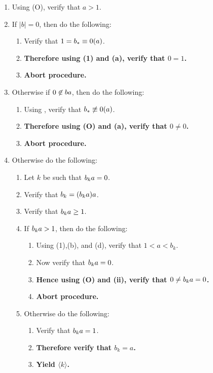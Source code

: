 \documentclass[twocolumn]{article}
\let\div\relax
\DeclareMathOperator{\div}{div}
\let\mod\relax
\DeclareMathOperator{\mod}{mod}
\newcommand{\procedurehr}[2][]{\hyperref[sec:procedure #2]{\ifthenelse{\equal{#1}{}}{procedure #2}{#1}}}
\begin{document}
				\begin{enumerate}
					\item Using (O), verify that $a>1$.
					\item If $\lvert b\rvert=0$, then do the following:
					\begin{enumerate}
						\item Verify that $1=b_*\equiv 0(\mod a)$.
						\item \textbf{Therefore using (1) and (a), verify that $0=1$.}
						\item \textbf{Abort procedure.}
					\end{enumerate}
					\item Otherwise if $0\not\in b\mod a$, then do the following:
					\begin{enumerate}
						\item Using \procedurehr{1.23}, verify that $b_*\not\equiv 0 (\mod a)$.
						\item \textbf{Therefore using (O) and (a), verify that $0\ne 0$.}
						\item \textbf{Abort procedure.}
					\end{enumerate}
					\item Otherwise do the following:
					\begin{enumerate}
						\item Let $k$ be such that $b_k\mod a=0$.
						\item Verify that $b_k=(b_k\div a)a$.
						\item Verify that $b_k\div a\ge 1$.
						\item If $b_k\div a>1$, then do the following:
						\begin{enumerate}
							\item Using (1),(b), and (d), verify that $1<a<b_k$.
							\item Now verify that $b_k\mod a=0$.
							\item \textbf{Hence using (O) and (ii), verify that $0\ne b_k\mod a=0$.}
							\item \textbf{Abort procedure.}
						\end{enumerate}
						\item Otherwise do the following:
						\begin{enumerate}
							\item Verify that $b_k\div a=1$.
							\item \textbf{Therefore verify that $b_k=a$.}
							\item \textbf{Yield $\langle k\rangle$.}
						\end{enumerate}
					\end{enumerate}
				\end{enumerate}
\end{document}
